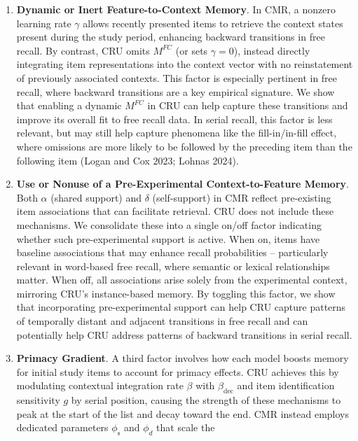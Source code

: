 \documentclass[
  letterpaper,
  DIV=11,
  numbers=noendperiod]{scrartcl}
\begin{document}
\begin{enumerate}
\def\labelenumi{\arabic{enumi}.}
\item
  \textbf{Dynamic or Inert Feature-to-Context Memory}. In CMR, a nonzero
  learning rate \(\gamma\) allows recently presented items to retrieve
  the context states present during the study period, enhancing backward
  transitions in free recall. By contrast, CRU omits \(M^{FC}\) (or sets
  \(\gamma=0\)), instead directly integrating item representations into
  the context vector with no reinstatement of previously associated
  contexts. This factor is especially pertinent in free recall, where
  backward transitions are a key empirical signature. We show that
  enabling a dynamic \(M^{FC}\) in CRU can help capture these
  transitions and improve its overall fit to free recall data. In serial
  recall, this factor is less relevant, but may still help capture
  phenomena like the fill-in/in-fill effect, where omissions are more
  likely to be followed by the preceding item than the following item
  (Logan and Cox 2023; Lohnas 2024).
\item
  \textbf{Use or Nonuse of a Pre-Experimental Context-to-Feature
  Memory}. Both \(\alpha\) (shared support) and \(\delta\)
  (self-support) in CMR reflect pre-existing item associations that can
  facilitate retrieval. CRU does not include these mechanisms. We
  consolidate these into a single on/off factor indicating whether such
  pre-experimental support is active. When on, items have baseline
  associations that may enhance recall probabilities -- particularly
  relevant in word-based free recall, where semantic or lexical
  relationships matter. When off, all associations arise solely from the
  experimental context, mirroring CRU's instance-based memory. By
  toggling this factor, we show that incorporating pre-experimental
  support can help CRU capture patterns of temporally distant and
  adjacent transitions in free recall and can potentially help CRU
  address patterns of backward transitions in serial recall.
\item
  \textbf{Primacy Gradient}. A third factor involves how each model
  boosts memory for initial study items to account for primacy effects.
  CRU achieves this by modulating contextual integration rate \(\beta\)
  with \(\beta_\text{dec}\) and item identification sensitivity \(g\) by
  serial position, causing the strength of these mechanisms to peak at
  the start of the list and decay toward the end. CMR instead employs
  dedicated parameters \(\phi_\text{s}\) and \(\phi_{d}\) that scale the

\end{enumerate}
\end{document}
